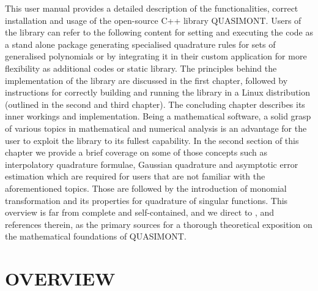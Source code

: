 \documentclass[a4paper, twosided]{book}
\begin{document}
This user manual provides a detailed description of the functionalities, correct installation and usage of the open-source C++ library QUASIMONT. Users of the library can refer to the following content for setting and executing the code as a stand alone package generating specialised quadrature rules for sets of generalised polynomials or by integrating it in their custom application for more flexibility as additional codes or static library. The principles behind the implementation of the library are discussed in the first chapter, followed by instructions for correctly building and running the library in a Linux distribution (outlined in the second and third chapter). The concluding chapter describes its inner workings and implementation. Being a mathematical software, a solid grasp of various topics in mathematical and numerical analysis is an advantage for the user to exploit the library to its fullest capability. In the second section of this chapter we provide a brief coverage on some of those concepts such as interpolatory quadrature formulae, Gaussian quadrature and asymptotic error estimation which are required for users that are not familiar with the aforementioned topics. Those are followed by the introduction of monomial transformation and its properties for quadrature of singular functions. This overview is far from complete and self-contained, and we direct to \cite{Lombardi09, Lombardi21}, and references therein, as the primary sources for a thorough theoretical exposition on the mathematical foundations of QUASIMONT.

\section[Overview]{\changefont OVERVIEW}\label{Sec1.1}
\end{document}
